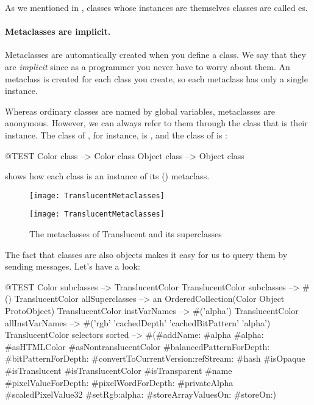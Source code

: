 \documentclass[a4paper,10pt,twoside]{book}
\begin{document}
As we mentioned in , classes whose instances are themselves classes are called es.

\paragraph{Metaclasses are implicit.}
Metaclasses are automatically created when you define a class.
We say that they are \emph{implicit} since as a programmer you never have to worry about them.
An  metaclass is created for each class you create, so each metaclass has only a single instance.

Whereas ordinary classes are named by global variables, metaclasses are anonymous.
However, we can always refer to them through the class that is their instance.
The class of , for instance, is , and the class of  is :
\begin{code}{@TEST}
Color class   --> Color class
Object class --> Object class
\end{code}

\noindent
{} shows how each class is an instance of its () metaclass.

\begin{center}
\begin{figure}[!ht]
\ifluluelse
	{\centerline {\texttt{[image: TranslucentMetaclasses]}}}
	{\centerline {\texttt{[image: TranslucentMetaclasses]}}}
\caption{The metaclasses of Translucent and its superclasses\label{fig:translucentmetaclasses}}
\end{figure}
\end{center}

The fact that classes are also objects makes it easy for us to query them by sending messages.
Let's have a look:

\begin{code}{@TEST}
Color subclasses                           --> {TranslucentColor}
TranslucentColor subclasses         --> #()
TranslucentColor allSuperclasses  --> an OrderedCollection(Color Object ProtoObject)
TranslucentColor instVarNames     --> #('alpha')
TranslucentColor allInstVarNames --> #('rgb' 'cachedDepth' 'cachedBitPattern' 'alpha')
TranslucentColor selectors sorted --> #(#addName: #alpha #alpha: #asHTMLColor #asNontranslucentColor #balancedPatternForDepth: #bitPatternForDepth: #convertToCurrentVersion:refStream: #hash #isOpaque #isTranslucent #isTranslucentColor #isTransparent #name #pixelValueForDepth: #pixelWordForDepth: #privateAlpha #scaledPixelValue32 #setRgb:alpha: #storeArrayValuesOn: #storeOn:)
\end{code}
\end{document}
